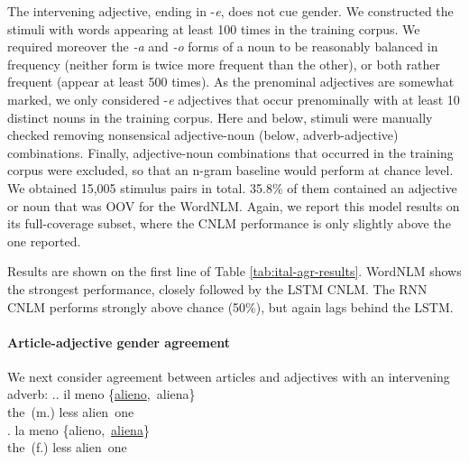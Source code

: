 The intervening adjective, ending in -\emph{e}, does not cue
gender. We constructed the stimuli with words appearing at least 100
times in the training corpus. We required moreover the \emph{-a}
and \emph{-o} forms of a noun to be reasonably balanced in frequency
(neither form is twice more frequent than the other), or both rather
frequent (appear at least 500 times). As the prenominal adjectives are
somewhat marked, we only considered -\emph{e} adjectives that occur
prenominally with at least 10 distinct nouns in the training corpus.
Here and below, stimuli were manually checked removing nonsensical
adjective-noun (below, adverb-adjective) combinations. Finally, adjective-noun combinations that
occurred in the training corpus were excluded, so that an n-gram
baseline would perform at chance level. We obtained 15,005 stimulus
pairs in total. %
35.8\% of them contained an adjective or noun that was
OOV for the WordNLM. Again, we report this model results on its
full-coverage subset, where the CNLM performance is only slightly above
the one reported.

Results are shown on the first line of
Table \ref{tab:ital-agr-results}.  WordNLM shows the strongest
performance, closely followed by the LSTM CNLM.  The RNN CNLM
performs strongly above chance (50\%), but again lags behind the LSTM.

\paragraph{Article-adjective gender agreement}
We next consider agreement between articles and adjectives with an intervening adverb:
\ex.\ag. il meno \{\underline{alieno},\ aliena\} \\
the\ (m.) less alien\ one \\
\bg. la meno \{alieno,\ \underline{aliena}\} \\
the\ (f.) less alien\ one \\

